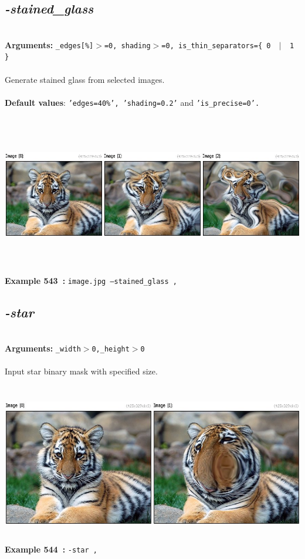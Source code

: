 \documentclass[a4paper,11pt,twoside]{book}
\begin{document}
\subsection{\emph{-stained\_glass} }\vspace*{-0.5em}
~\\\textbf{Arguments: } 
{\small \texttt{\_edges[\%]$>$=0, shading$>$=0, is\_thin\_separators=\{ 0 ~$|$~ 1 \}}}\\~\\
Generate stained glass from selected images.
~\\~\\\textbf{Default values}: {\small \texttt{'edges=40\%', 'shading=0.2'} and \texttt{'is\_precise=0'.}}
\begin{center}\includegraphics[keepaspectratio=true,height=7cm,width=\textwidth]{img/gmic_def543.jpg}\\
{\footnotesize \textbf{Example 543~:} \texttt{image.jpg --stained\_glass ,}}
\end{center}

\subsection{\emph{-star} }\vspace*{-0.5em}
~\\\textbf{Arguments: } 
{\small \texttt{\_width$>$0,\_height$>$0}}\\~\\
Input star binary mask with specified size.
\begin{center}\includegraphics[keepaspectratio=true,height=7cm,width=\textwidth]{img/gmic_def544.jpg}\\
{\footnotesize \textbf{Example 544~:} \texttt{-star ,}}
\end{center}
\end{document}
